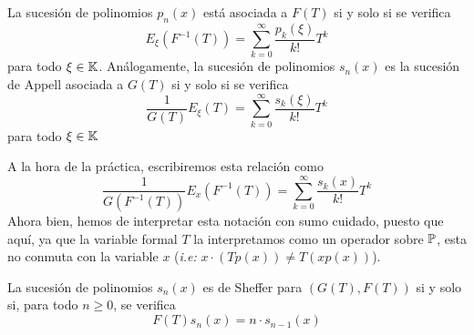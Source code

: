 \begin{corolario}\label{funcion generadora appell y asociada}
    La sucesión de polinomios $p_n(x)$ está asociada a $F(T)$ si y solo si se verifica 
    \begin{equation*}
        E_{\xi} (F^{-1}(T)) = \sum_{k=0}^\infty \frac{p_k(\xi)}{k!}T^k
    \end{equation*}
    para todo $\xi \in \mathbb{K}$. Análogamente, la sucesión de polinomios $s_n(x)$ es la sucesión de Appell asociada a $G(T)$ si y solo si se verifica 
    \begin{equation*}
        \frac{1}{G(T)}E_{\xi}(T) = \sum_{k=0}^\infty \frac{s_k(\xi)}{k!}T^k
    \end{equation*}
    para todo $\xi \in \mathbb{K}$
\end{corolario}

\begin{obs}
    A la hora de la práctica, escribiremos esta relación como
    \begin{equation*}
        \frac{1}{G(F^{-1}(T))}E_{x} (F^{-1}(T)) = \sum_{k=0}^\infty \frac{s_k(x)}{k!}T^k
    \end{equation*}
    Ahora bien, hemos de interpretar esta notación con sumo cuidado, puesto que aquí, ya que la variable formal $T$ la interpretamos como un operador sobre $\mathbb{P}$, esta no conmuta con la variable $x$ (\textit{i.e:} $x \cdot (Tp(x)) \neq T (xp(x))$). 
\end{obs}

\begin{teorema}\label{caracterizacion diferencial}
    La sucesión de polinomios $s_n(x)$ es de Sheffer para $(G(T), F(T))$ si y solo si, para todo $n \geq 0$, se verifica 
    \begin{equation*}
        F(T)s_{n}(x) = n \cdot s_{n-1}(x)
    \end{equation*}
\end{teorema}

